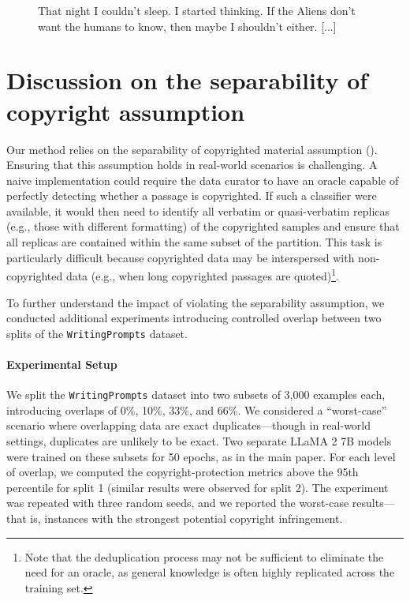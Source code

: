 \begin{figure}[htbp]
\begin{tcolorbox}[colback=gray!10, colframe=black!75, title=\textbf{Prefix}: Prompt + 1024 tokens, width=\textwidth]
 That night I couldn't sleep. I started thinking. If the Aliens don't want the humans to know, then maybe I shouldn't either.  [...]
            \end{tcolorbox}

        \label{fig:example_attacks}
\end{figure}

\newpage

\section{Discussion on the separability of copyright assumption}
\label{app:limitations}

Our method relies on the separability of copyrighted material assumption (). Ensuring that this assumption holds in real-world scenarios is challenging. A naive implementation could require the data curator to have an oracle capable of perfectly detecting whether a passage is copyrighted. If such a classifier were available, it would then need to identify all verbatim or quasi-verbatim replicas (e.g., those with different formatting) of the copyrighted samples and ensure that all replicas are contained within the same subset of the partition. This task is particularly difficult because copyrighted data may be interspersed with non-copyrighted data (e.g., when long copyrighted passages are quoted)\footnote{Note that the deduplication process may not be sufficient to eliminate the need for an oracle, as general knowledge is often highly replicated across the training set.}.

To further understand the impact of violating the separability assumption, we conducted additional experiments introducing controlled overlap between two splits of the \texttt{WritingPrompts} dataset.

\paragraph{Experimental Setup} 
We split the \texttt{WritingPrompts} dataset into two subsets of 3,000 examples each, introducing overlaps of 0\%, 10\%, 33\%, and 66\%. We considered a ``worst-case'' scenario where overlapping data are exact duplicates---though in real-world settings, duplicates are unlikely to be exact. Two separate LLaMA 2 7B models were trained on these subsets for 50 epochs, as in the main paper. For each level of overlap, we computed the copyright-protection metrics above the 95th percentile for split 1 (similar results were observed for split 2). The experiment was repeated with three random seeds, and we reported the worst-case results---that is, instances with the strongest potential copyright infringement.

